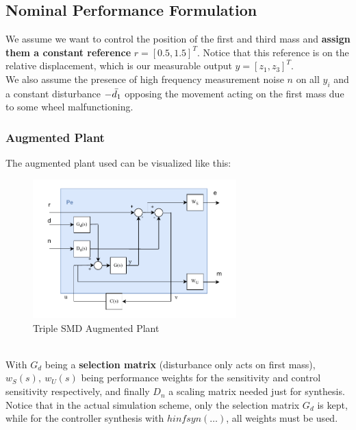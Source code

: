 \documentclass[a4paper, 12pt]{article}
\def\FigureEight{\centering\includegraphics[width=0.7\textwidth]{Figures/fig08.pdf}}
\begin{document}
\subsection{Nominal Performance Formulation}
We assume we want to control the position of the first and third mass and \textbf{assign them a constant reference} $r = [0.5,1.5]^T$. Notice that this reference is on the relative displacement, which is our measurable output $y = [z_1, z_3]^T$.
\\We also assume the presence of high frequency measurement noise $n$ on all $y_i$ and a constant disturbance $-\Bar{d_1}$ opposing the movement acting on the first mass due to some wheel malfunctioning.
\clearpage
\subsubsection{Augmented Plant}
The augmented plant used can be visualized like this:
\begin{figure}[h!]
    \FigureEight
    \caption{Triple SMD Augmented Plant}
    \label{fig:fig08}
\end{figure}
\\With $G_d$ being a \textbf{selection matrix} (disturbance only acts on first mass), $w_S(s),\ w_U(s)$ being performance weights for the sensitivity and control sensitivity respectively, and finally $D_n$ a scaling matrix needed just for synthesis. 
\\Notice that in the actual simulation scheme, only the selection matrix $G_d$ is kept, while for the controller synthesis with $hinfsyn(\dots)$, all weights must be used.
\end{document}
